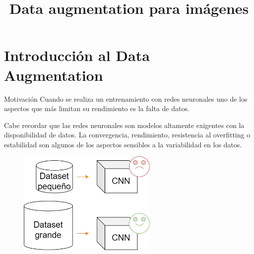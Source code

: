 



\title{Data augmentation para imágenes}


\maketitle

\section{Introducción al Data Augmentation}

\begin{frame}{Motivación}
Cuando se realiza un \alert{entrenamiento} con redes neuronales uno de los aspectos que más \alert{limitan su rendimiento} es la falta de datos.

Cabe recordar que las redes neuronales son modelos \alert{altamente exigentes} con la disponibilidad de datos. La \alert{convergencia}, \alert{rendimiento}, \alert{resistencia al overfitting} o \alert{estabilidad} son algunos de los aspectos sensibles a la variabilidad en los datos.

\begin{figure}
    \centering
    \includegraphics[width=0.6\textwidth]{Slides/figures/Tema 3/DA_Performance.png}
\end{figure}
\end{frame}

